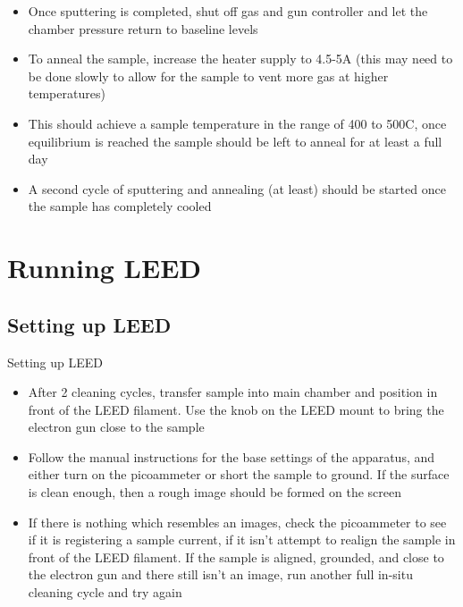 \documentclass[11pt]{beamer}
\begin{document}
\begin{frame}
    \begin{itemize}
        \item Once sputtering is completed, shut off gas and gun controller and let the chamber pressure return to baseline levels
        \item To anneal the sample, increase the heater supply to 4.5-5A (this may need to be done slowly to allow for the sample to vent more gas at higher temperatures)
        \item This should achieve a sample temperature in the range of 400 to 500C, once equilibrium is reached the sample should be left to anneal for at least a full day
        \item A second cycle of sputtering and annealing (at least) should be started once the sample has completely cooled 
    \end{itemize}
\end{frame}

\section{Running LEED}

\subsection{Setting up LEED}
\begin{frame}{Setting up LEED}
    \begin{itemize}
        \item After 2 cleaning cycles, transfer sample into main chamber and position in front of the LEED filament. Use the knob on the LEED mount to bring the electron gun close to the sample
        \item Follow the manual instructions for the base settings of the apparatus, and either turn on the picoammeter or short the sample to ground. If the surface is clean enough, then a rough image should be
        formed on the screen 
        \item If there is nothing which resembles an images, check the picoammeter to see if it is registering a sample current, if it isn't attempt to realign the sample in front of the LEED filament. If the sample is
        aligned, grounded, and close to the electron gun and there still isn't an image, run another full in-situ cleaning cycle and try again
    \end{itemize}
\end{frame}
\end{document}
